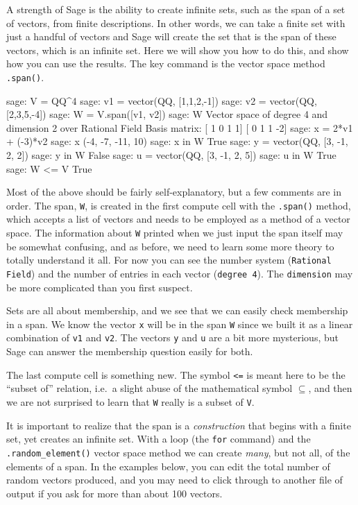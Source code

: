 A strength of Sage is the ability to create infinite sets, such as the span of a set of vectors, from finite descriptions.  In other words, we can take a finite set with just a handful of vectors and Sage will create the set that is the span of these vectors, which is an infinite set.  Here we will show you how to do this, and show how you can use the results.  The key command is the vector space method \verb?.span()?.\par
%
\begin{sageexample}
sage: V = QQ^4
sage: v1 = vector(QQ, [1,1,2,-1])
sage: v2 = vector(QQ, [2,3,5,-4])
sage: W = V.span([v1, v2])
sage: W
Vector space of degree 4 and dimension 2 over Rational Field
Basis matrix:
[ 1  0  1  1]
[ 0  1  1 -2]
sage: x = 2*v1 + (-3)*v2
sage: x
(-4, -7, -11, 10)
sage: x in W
True
sage: y = vector(QQ, [3, -1, 2, 2])
sage: y in W
False
sage: u = vector(QQ, [3, -1, 2, 5])
sage: u in W
True
sage: W <= V
True
\end{sageexample}
%
Most of the above should be fairly self-explanatory, but a few comments are in order.  The span, \verb?W?, is created in the first compute cell with the \verb?.span()? method, which accepts a list of vectors and needs to be employed as a method of a vector space.  The information about \verb?W? printed when we just input the span itself may be somewhat confusing, and as before, we need to learn some more theory to totally understand it all.  For now you can see the number system (\verb?Rational Field?) and the number of entries in each vector (\verb?degree 4?).  The \verb?dimension? may be more complicated than you first suspect.\par
%
Sets are all about membership, and we see that we can easily check membership in a span.  We know the vector \verb?x? will be in the span \verb?W? since we built it as a linear combination of \verb?v1? and \verb?v2?.  The vectors \verb?y? and \verb?u? are a bit more mysterious, but Sage can answer the membership question easily for both.\par
%
The last compute cell is something new.  The symbol \verb?<=? is meant here to be the ``subset of'' relation, i.e.\ a slight abuse of the mathematical symbol $\subseteq$, and then we are not surprised to learn that \verb?W? really is a subset of \verb?V?.\par
%
It is important to realize that the span is a \emph{construction} that begins with a finite set, yet creates an infinite set.  With a loop (the \verb?for? command) and the \verb?.random_element()? vector space method we can create \emph{many}, but not all, of the elements of a span.  In the examples below, you can edit the total number of random vectors produced, and you may need to click through to another file of output if you ask for more than about 100 vectors.\par
